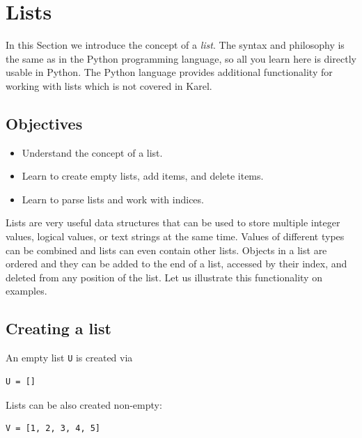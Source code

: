 \section{Lists}

In this Section we introduce the concept of a {\em list}. 
The syntax and philosophy is the same as in the Python programming 
language, so all you learn here is directly usable in Python.
The Python language provides additional functionality for
working with lists which is not covered in Karel.

\subsection[\ \ Objectives]{Objectives} 
 
\begin{itemize}
\item Understand the concept of a list.
\item Learn to create empty lists, add items, and delete items.
\item Learn to parse lists and work with indices.
\end{itemize}
Lists are very useful data structures that can be used to store multiple 
integer values, logical values, or text strings at the same time. 
Values of different types can be combined and lists can even contain other lists.
Objects in a list are ordered and they can be added to the end of a list, 
accessed by their index, and deleted from any position of the list. Let us 
illustrate this functionality on examples.

\subsection[\ \ Creating a list]{Creating a list}

\noindent
An empty list {\tt U} is created via \\

\begin{bbox}
\begin{Verbatim}[commandchars=\\\{\}]
U = []
\end{Verbatim}
\end{bbox}
\vspace{6mm}

\noindent
Lists can be also created non-empty:\\

\begin{bbox}
\begin{Verbatim}[commandchars=\\\{\}]
V = [1, 2, 3, 4, 5]
\end{Verbatim}
\end{bbox}
\vspace{6mm}

